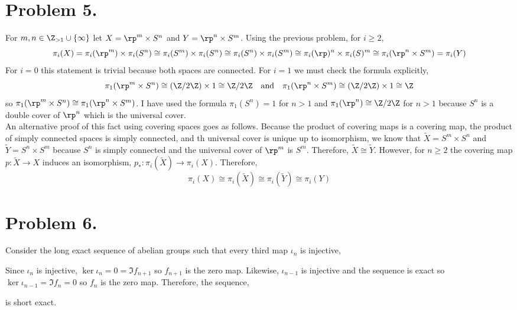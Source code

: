 \documentclass[12pt]{extarticle}
\begin{document}
\section*{Problem 5.}

For $m, n \in \Z_{> 1} \cup \{ \infty \}$ let $X = \rp^m \times S^n$ and $Y = \rp^n \times S^m$. Using the previous problem, for $ i \ge 2$,
\[ \pi_i(X) = \pi_i(\rp^m) \times \pi_i(S^n) \cong \pi_i(S^m) \times \pi_i(S^n) \cong \pi_i(S^n) \times \pi_i(S^m)  \cong \pi_i(\rp)^n \times \pi_i(S)^m \cong \pi_i(\rp^n \times S^m) = \pi_i(Y) \]
For $i = 0$ this statement is trivial because both spaces are connected. For $i = 1$ we must check the formula explicitly,
\[ \pi_1(\rp^m \times S^n) \cong (\Z / 2 \Z) \times 1 \cong \Z / 2 \Z \quad \text{and} \quad \pi_1(\rp^n \times S^m) \cong (\Z/2 \Z) \times 1 \cong \Z\]
so $\pi_1(\rp^m \times S^n) \cong \pi_1(\rp^n \times S^m)$. I have used the formula $\pi_1(S^n) = 1$ for $n > 1$ and $\pi_1(\rp^n) \cong \Z / 2 \Z$ for $n > 1$ because $S^n$ is a double cover of $\rp^n$ which is the universal cover. \bigskip\\
An alternative proof of this fact using covering spaces goes as follows. Because the product of covering maps is a covering map, the product of simply connected spaces is simply connected, and th universal cover is unique up to isomorphism, we know that $\tilde{X} = S^m \times S^n$ and $\tilde{Y} = S^n \times S^m$ because $S^n$ is simply connected and the universal cover of $\rp^m$ is $S^m$. Therefore, $\tilde{X} \cong \tilde{Y}$. However, for $n \ge 2$ the covering map $p : \tilde{X} \to X$ induces an isomorphism, $p_* : \pi_i(\tilde{X}) \to \pi_i(X)$. Therefore,
\[ \pi_i(X) \cong \pi_i(\tilde{X}) \cong \pi_i(\tilde{Y}) \cong \pi_i(Y) \]

\section*{Problem 6.}

Consider the long exact sequence of abelian groups such that every third map $\iota_n$ is injective,
\begin{center}
\end{center}
Since $\iota_n$ is injective, $\ker{\iota_n} = 0 = \Im{f_{n+1}}$ so $f_{n+1}$ is the zero map. Likewise, $\iota_{n-1}$ is injective and the sequence is exact so $\ker{\iota_{n - 1}} = \Im{f_n} = 0$ so $f_n$ is the zero map. Therefore, the sequence,  
\begin{center}
\end{center}
is short exact.
\end{document}
